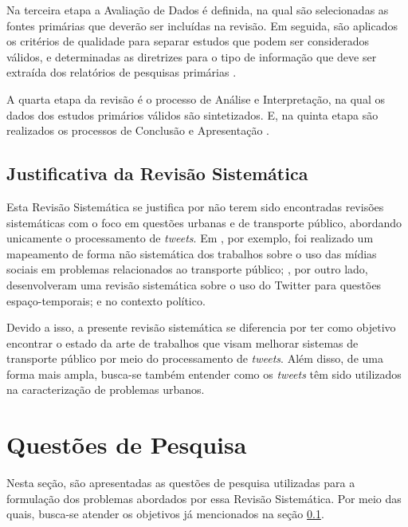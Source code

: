 \documentclass[
	12pt,				%
	oneside,			%
	a4paper,			%
	english,			%
	brazil				%
	]{abntex2ppgsi}
\begin{document}
Na terceira etapa a Avaliação de Dados é definida, na qual são selecionadas as fontes primárias que deverão ser incluídas na revisão. Em seguida,  são aplicados os critérios de qualidade para separar estudos que podem ser considerados válidos, e determinadas as diretrizes para o tipo de informação que deve ser extraída dos relatórios de pesquisas primárias \cite{biolchini2005techincal}.

A quarta etapa da revisão é o processo de Análise e Interpretação, na qual os dados dos estudos primários válidos são sintetizados. E, na quinta etapa são realizados os processos de Conclusão e Apresentação \cite{biolchini2005techincal}.

\subsection{Justificativa da Revisão Sistemática}
\label{justificativa}
Esta Revisão Sistemática se justifica por não terem sido encontradas revisões sistemáticas com o foco em questões urbanas e de transporte público, abordando unicamente o processamento de \textit{tweets}. Em \cite{Chaniotakis2016}, por exemplo, foi realizado um mapeamento de forma não sistemática dos trabalhos sobre o uso das mídias sociais em problemas relacionados ao transporte público; \cite{steiger2015advanced}, por outro lado, desenvolveram uma revisão sistemática sobre o uso do Twitter para questões espaço-temporais; e \cite{jungherr2016twitter} no contexto político.%

Devido a isso, a presente revisão sistemática se diferencia por ter como objetivo encontrar o estado da arte de trabalhos que visam melhorar sistemas de transporte público por meio do processamento de \textit{tweets}. Além disso, de uma forma mais ampla, busca-se também entender como os \textit{tweets} têm sido utilizados na caracterização  de problemas urbanos.

\section{Questões de Pesquisa}
\label{questoes}
Nesta seção, são apresentadas as questões de pesquisa utilizadas para a formulação dos problemas abordados por essa Revisão Sistemática. Por meio das quais, busca-se atender os objetivos já mencionados na seção \ref{justificativa}.
\end{document}

